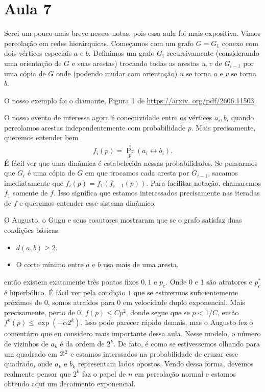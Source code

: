 \section{Aula 7}

Serei um pouco mais breve nessas notas, pois essa aula
foi mais expositiva. Vimos percolação em redes hierárquicas.
Começamos com um grafo $G=G_1$ conexo com dois vértices especiais
$a$ e $b$. Definimos um grafo $G_i$ recursivamente
(considerando uma orientação de $G$  e suas arestas)
trocando todas as arestas ${u,v}$ de $G_{i-1}$ por uma cópia de $G$
onde (podendo mudar com orientação) $u$ se torna $a$ e $v$ se
torna $b$.

O nosso exemplo foi o diamante, Figura 1 de \url{https://arxiv.
org/pdf/2606.11503}.

O nosso evento de interesse agora é conectividade entre os vértices
$a_i,b_i$ quando
percolamos arestas independentemente com probabilidade $p$. Mais precisamente,
queremos entender bem
\[
	f_i(p) = \Pr_p^i(a_i \leftrightarrow b_i).
\]
É fácil ver que uma dinâmica é estabelecida nessas probabilidades. Se pensarmos
que $G_{i}$ é uma cópia de $G$ em que trocamos cada aresta por $G_{i-1}$,
sacamos imediatamente que $f_i(p) = f_1(f_{i-1}(p))$. Para facilitar
notação, chamaremos $f_1$ somente de $f$. Isso significa que estamos
interessados
precisamente nas iteradas de $f$ e queremos entender esse sistema dinâmico.

O Augusto, o Gugu e seus coautores mostraram que se o grafo satisfaz
duas condições básicas:
\begin{itemize}
	\item  $d(a,b) \geq 2$.
	\item O corte mínimo entre $a$ e $b$ usa mais de uma aresta.
\end{itemize}
então existem exatamente três pontos fixos $0, 1$ e $p_c$. Onde $0$ e
$1$ são atratores
e $p_c^*$ é hiperbólico. É fácil ver pela condição $1$ que se
estivermos suficientemente
próximos de $0$, somos atraídos para $0$ em velocidade duplo
exponencial. Mais precisamente,
perto de $0$, $f(p) \leq Cp^2$, donde segue que se $p < 1/C$, então
$f^{k}(p) \leq \exp(-\alpha2^k)$. Isso pode parecer rápido demais, mas o Augusto
fez o comentário que eu considero mais importante dessa aula. Nesse
modelo, o número de vizinhos
de $a_k$ é da ordem de $2^k$. De fato, é como se estivessemos olhando
para um quadrado em $\mathbb{Z}^2$
e estamos interssados na probabilidade de cruzar esse quadrado, onde
$a_k$ e $b_k$ representam
lados opostos. Vendo dessa forma, devemos realmente pensar que $2^k$
faz o papel de $n$
em percolação normal e estamos obtendo aqui um decaimento exponencial.


